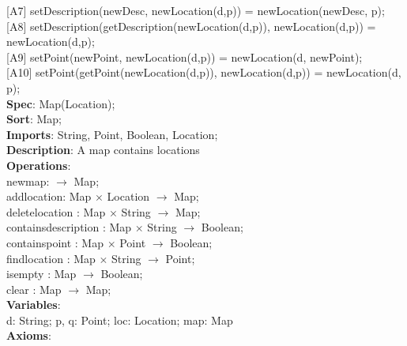\documentclass[12pt]{article}
\begin{document}
\begin{spacing}{1.5}
\hspace*{5mm} [A7] setDescription(newDesc, newLocation(d,p)) = newLocation(newDesc, p);\\
\hspace*{5mm} [A8] setDescription(getDescription(newLocation(d,p)), newLocation(d,p)) = newLocation(d,p);\\
\hspace*{5mm} [A9] setPoint(newPoint, newLocation(d,p)) = newLocation(d, newPoint);\\
\hspace*{5mm} [A10] setPoint(getPoint(newLocation(d,p)), newLocation(d,p)) = newLocation(d, p);\\

\noindent \textbf{Spec}: Map(Location);\\
\noindent \textbf{Sort}: Map;\\
\noindent \textbf{Imports}: String, Point, Boolean, Location;\\
\noindent \textbf{Description}: A map contains locations\\
\noindent \textbf{Operations}:\\
\hspace*{5mm} newmap: $\rightarrow$ Map;\\
\hspace*{5mm} addlocation: Map $\times$ Location $\rightarrow$ Map;\\
\hspace*{5mm} deletelocation : Map $\times$ String $\rightarrow$ Map;\\
\hspace*{5mm} containsdescription : Map $\times$ String $\rightarrow$ Boolean;\\
\hspace*{5mm} containspoint : Map $\times$ Point  $\rightarrow$ Boolean;\\
\hspace*{5mm} findlocation : Map $\times$ String  $\rightarrow$ Point;\\
\hspace*{5mm} isempty : Map $\rightarrow$ Boolean;\\
\hspace*{5mm} clear : Map $\rightarrow$ Map;\\
\noindent \textbf{Variables}:\\
\hspace*{5mm} d: String; p, q: Point; loc: Location; map: Map\\
\noindent \textbf{Axioms}:\\

\end{spacing}
\end{document}
